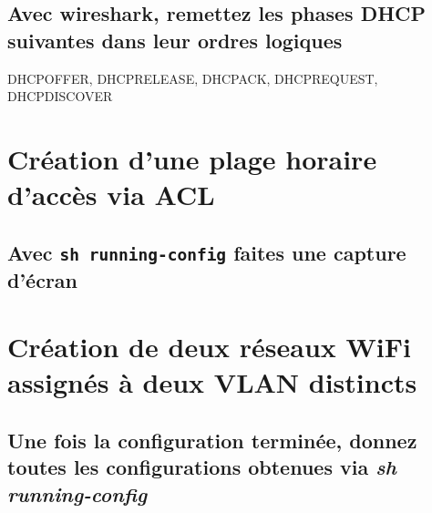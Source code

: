 \documentclass[12pt, a4paper]{article}
\begin{document}
    \subsection{Avec wireshark, remettez les phases DHCP suivantes dans leur ordres logiques}

    DHCPOFFER, DHCPRELEASE, DHCPACK, DHCPREQUEST, DHCPDISCOVER

\section{Création d'une plage horaire d'accès via ACL}

    \subsection{Avec \texttt{sh running-config} faites une capture d'écran}

\section{Création de deux réseaux WiFi assignés à deux VLAN distincts}

    \subsection{Une fois la configuration terminée, donnez toutes les configurations obtenues via \textit{sh running-config}}

    
\end{document}
